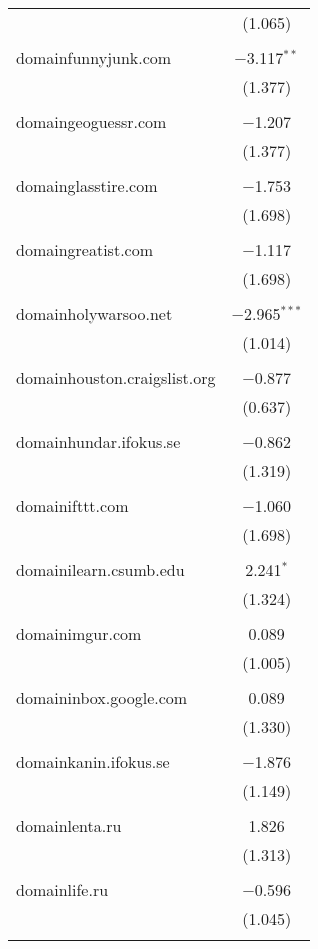 \begin{table}[!htbp]
\begin{tabular}{@{\extracolsep{5pt}}lc}
  & (1.065) \\ 
  & \\ 
 domainfunnyjunk.com & $-$3.117$^{**}$ \\ 
  & (1.377) \\ 
  & \\ 
 domaingeoguessr.com & $-$1.207 \\ 
  & (1.377) \\ 
  & \\ 
 domainglasstire.com & $-$1.753 \\ 
  & (1.698) \\ 
  & \\ 
 domaingreatist.com & $-$1.117 \\ 
  & (1.698) \\ 
  & \\ 
 domainholywarsoo.net & $-$2.965$^{***}$ \\ 
  & (1.014) \\ 
  & \\ 
 domainhouston.craigslist.org & $-$0.877 \\ 
  & (0.637) \\ 
  & \\ 
 domainhundar.ifokus.se & $-$0.862 \\ 
  & (1.319) \\ 
  & \\ 
 domainifttt.com & $-$1.060 \\ 
  & (1.698) \\ 
  & \\ 
 domainilearn.csumb.edu & 2.241$^{*}$ \\ 
  & (1.324) \\ 
  & \\ 
 domainimgur.com & 0.089 \\ 
  & (1.005) \\ 
  & \\ 
 domaininbox.google.com & 0.089 \\ 
  & (1.330) \\ 
  & \\ 
 domainkanin.ifokus.se & $-$1.876 \\ 
  & (1.149) \\ 
  & \\ 
 domainlenta.ru & 1.826 \\ 
  & (1.313) \\ 
  & \\ 
 domainlife.ru & $-$0.596 \\ 
  & (1.045) \\ 
  & \\ 

\end{tabular}
\end{table}
